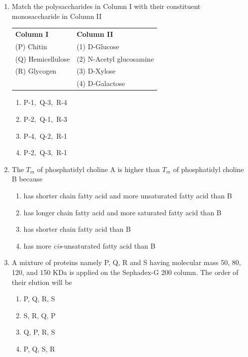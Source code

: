 \documentclass[journal,12pt,onecolumn]{IEEEtran}
\begin{document}
\begin{enumerate}
\item Match the polysaccharides in Column I with their constituent monosaccharide in Column II

\noindent
\begin{tabular}{p{6cm} p{6cm}}
\textbf{Column I} & \textbf{Column II} \\
(P) Chitin & (1) D-Glucose \\
(Q) Hemicellulose & (2) N-Acetyl glucosamine \\
(R) Glycogen & (3) D-Xylose \\
& (4) D-Galactose
\end{tabular}

\begin{multicols}{2}
\begin{enumerate}[label=(\Alph*)]
\item P-1,\ Q-3,\ R-4
\item  P-2,\ Q-1,\ R-3
\item   P-4,\ Q-2,\ R-1
\item    P-2,\ Q-3,\ R-1
\end{enumerate}
\end{multicols}
\item The $T_m$ of phosphatidyl choline A is higher than $T_m$ of phosphatidyl choline B because
\begin{multicols}{2}
\begin{enumerate}[label=(\Alph*)]
\item has shorter chain fatty acid and more unsaturated fatty acid than B
\item has longer chain fatty acid and more saturated fatty acid than B
\item has shorter chain fatty acid than B
\item has more \textit{cis}-unsaturated fatty acid than B
\end{enumerate}
\end{multicols}

\item A mixture of proteins namely P, Q, R and S having molecular mass 50, 80, 120, and 150 KDa is applied on the Sephadex-G 200 column. The order of their elution will be
\begin{multicols}{2}
\begin{enumerate}[label=(\Alph*)]
\item P, Q, R, S
\item S, R, Q, P
\item Q, P, R, S
\item P, Q, S, R
\end{enumerate}
\end{multicols}


\end{enumerate}
\end{document}
